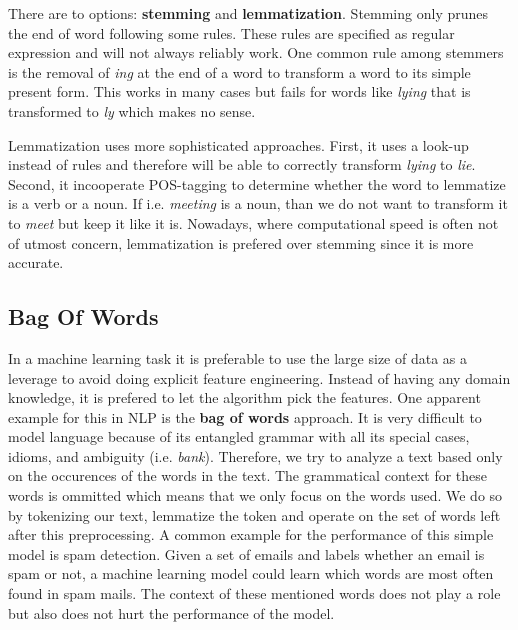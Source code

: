 There are to options: \textbf{stemming} and \textbf{lemmatization}. Stemming only prunes the end of word following some rules. These rules are specified as regular expression and will not always reliably work. One common rule among stemmers is the removal of \textit{ing} at the end of a word to transform a word to its simple present form. This works in many cases but fails for words like \textit{lying} that is transformed to \textit{ly} which makes no sense.

Lemmatization uses more sophisticated approaches. First, it uses a look-up instead of rules and therefore will be able to correctly transform \textit{lying} to \textit{lie}. Second, it incooperate POS-tagging to determine whether the word to lemmatize is a verb or a noun. If i.e. \textit{meeting} is a noun, than we do not want to transform it to \textit{meet} but keep it like it is. Nowadays, where computational speed is often not of utmost concern, lemmatization is prefered over stemming since it is more accurate.


\subsection{Bag Of Words}
In a machine learning task it is preferable to use the large size of data as a leverage to avoid
doing explicit feature engineering. Instead of having any domain knowledge, it is prefered to let the algorithm pick the features. One apparent example for this in NLP is the \textbf{bag of words} approach. It is very difficult to model language because of its entangled grammar with all its special cases, idioms, and ambiguity (i.e. \textit{bank}). Therefore, we try to analyze a text based only on the occurences of the words in the text. The grammatical context for these words is ommitted which means that we only focus on the words used. We do so by tokenizing our text, lemmatize the token and operate on the set of words left after this preprocessing. A common example for the performance of this simple model is spam detection. Given a set of emails and labels whether an email is spam or not, a machine learning model could learn which words are most often found in spam mails. The context of these mentioned words does not play a role but also does not hurt the performance of the model.

